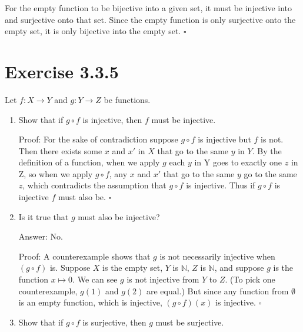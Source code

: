 \documentclass{assignment}
\newenvironment{q}
    {\begin{bfseries}}
    {\end{bfseries}}
\begin{document}
For the empty function to be bijective into a given set, it must be injective into and surjective onto that set. Since the empty function is only surjective onto the empty set, it is only bijective into the empty set.
$\square$

\section*{Exercise 3.3.5}
\begin{q}
Let $f: X \to Y$ and $g: Y \to Z$ be functions.
\end{q}

\begin{enumerate}
    \item
    \begin{q}
        Show that if $g \circ f$ is injective, then $f$ must be injective. 
    \end{q}

    Proof:
    For the sake of contradiction suppose $g \circ f$ is injective but $f$ is not. 
    Then there exists some $x$ and $x'$ in $X$ that go to the same $y$ in $Y$. 
    By the definition of a function, when we apply $g$ each $y$ in Y goes to exactly one $z$ in Z, so when we apply $g \circ f$, any $x$ and $x'$ that go to the same $y$ go to the same $z$, which contradicts the assumption that $g \circ f$ is injective. 
    Thus if $g \circ f$ is injective $f$ must also be.
    $\square$

    \item
    \begin{q}
        Is it true that $g$ must also be injective? 
    \end{q}

    Answer: 
    No.

    Proof:
    A counterexample shows that $g$ is not necessarily injective when $(g \circ f)$ is. 
    Suppose $X$ is the empty set, $Y$ is $\mathbb{N}$, $Z$ is $\mathbb{N}$, and suppose $g$ is the function $x \mapsto 0$. 
    We can see $g$ is not injective from $Y$ to $Z$. (To pick one counterexample, $g(1)$ and $g(2)$ are equal.)
    But since any function from $\emptyset$ is an empty function, which is injective, $(g \circ f)(x)$ is injective.  
    $\square$

    \item
    \begin{q}
        Show that if $g \circ f$ is surjective, then $g$ must be surjective. 
    \end{q}


\end{enumerate}
\end{document}
